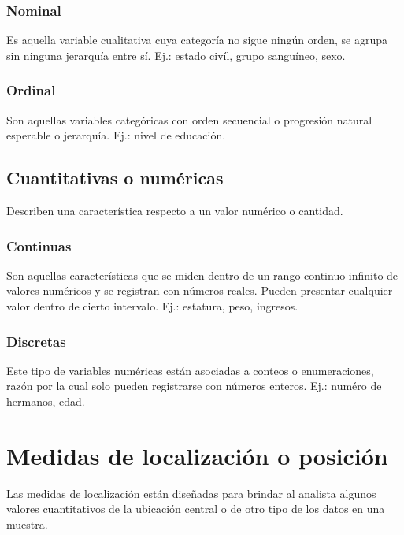 \documentclass{report}
\begin{document}
        \subsubsection*{Nominal}
          Es aquella variable cualitativa cuya categoría no sigue ningún orden, 
          se agrupa sin ninguna jerarquía entre sí. Ej.: estado civíl, grupo 
          sanguíneo, sexo.
        \subsubsection*{Ordinal} 
          Son aquellas variables categóricas con orden secuencial o progresión 
          natural esperable o jerarquía. Ej.: nivel de educación.

      \subsection*{Cuantitativas o numéricas}
        Describen una característica respecto a un valor numérico o cantidad.

        \subsubsection*{Continuas}
          Son aquellas características que se miden dentro de un rango continuo 
          infinito de valores numéricos y se registran con números reales. Pueden 
          presentar cualquier valor dentro de cierto intervalo. Ej.: estatura, 
          peso, ingresos.
        \subsubsection*{Discretas}
          Este tipo de variables numéricas están asociadas a conteos o enumeraciones, 
          razón por la cual solo pueden registrarse con números enteros. Ej.: numéro
          de hermanos, edad.
    \section*{Medidas de localización o posición}
      Las medidas de localización están diseñadas para brindar al analista algunos 
      valores cuantitativos de la ubicación central o de otro tipo de los datos en una 
      muestra.
      
\end{document}
